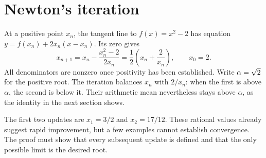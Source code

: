 \section{Newton's iteration}\label{sec:iteration}
At a positive point $x_n$, the tangent line to $f(x)=x^2-2$ has equation
$y=f(x_n)+2x_n(x-x_n)$. Its zero gives
\begin{equation}\label{eq:newton}
x_{n+1}=x_n-\frac{x_n^2-2}{2x_n}
       =\frac12\left(x_n+\frac{2}{x_n}\right),\qquad x_0=2.
\end{equation}
All denominators are nonzero once positivity has been established. Write
$\alpha=\sqrt{2}$ for the positive root. The iteration balances $x_n$ with
$2/x_n$: when the first is above $\alpha$, the second is below it.
Their arithmetic mean nevertheless stays above $\alpha$, as the identity in
the next section shows.

The first two updates are $x_1=3/2$ and $x_2=17/12$. These rational values
already suggest rapid improvement, but a few examples cannot establish
convergence. The proof must show that every subsequent update is defined and
that the only possible limit is the desired root.
